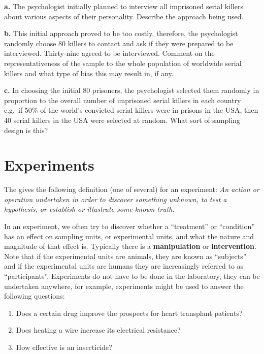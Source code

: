 \documentclass[
  oneside]{krantz}
\providecommand{\tightlist}{%
  \setlength{\itemsep}{0pt}\setlength{\parskip}{0pt}}
\begin{document}
\textbf{a.} The psychologist initially planned to interview all imprisoned serial killers about various aspects of their personality. Describe the approach being used.

\textbf{b.} This initial approach proved to be too costly, therefore, the psychologist randomly choose 80 killers to contact and ask if they were prepared to be interviewed. Thirty-nine agreed to be interviewed. Comment on the representativeness of the sample to the whole population of worldwide serial killers and what type of bias this may result in, if any.

\textbf{c.} In choosing the initial 80 prisoners, the psychologist selected them randomly in proportion to the overall number of imprisoned serial killers in each country e.g.~if 50\% of the world's convicted serial killers were in prisons in the USA, then 40 serial killers in the USA were selected at random. What sort of sampling design is this?

\hypertarget{experiments}{%
\section{Experiments}\label{experiments}}

The \citep{dictionary1980oxford} gives the following definition (one of several) for an experiment: \emph{An action or operation undertaken in order to discover something unknown, to test a hypothesis, or establish or illustrate some known truth.}

In an experiment, we often try to discover whether a ``treatment'' or ``condition'' has an effect on sampling units, or experimental units, and what the nature and magnitude of that effect is. Typically there is a \textbf{manipulation} or \textbf{intervention}. Note that if the experimental units are animals, they are known as ``subjects'' and if the experimental units are humans they are increasingly referred to as ``participants''. Experiments do not have to be done in the laboratory, they can be undertaken anywhere, for example, experiments might be used to answer the following questions:

\begin{enumerate}
\def\labelenumi{\arabic{enumi}.}
\tightlist
\item
  Does a certain drug improve the prospects for heart transplant patients?
\item
  Does heating a wire increase its electrical resistance?
\item
  How effective is an insecticide?
\end{enumerate}
\end{document}
